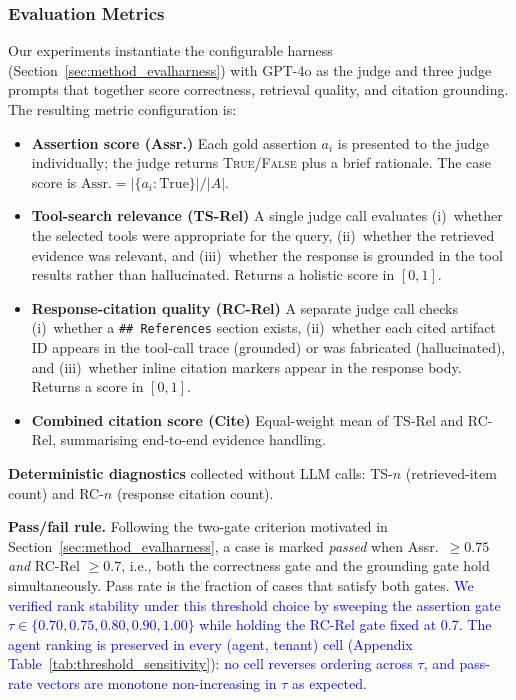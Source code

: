 \subsubsection{Evaluation Metrics}
\label{sec:eval-metrics}
Our experiments instantiate the configurable harness (Section~\ref{sec:method_evalharness}) with GPT-4o as the judge and three judge prompts that together score correctness, retrieval quality, and citation grounding. The resulting metric configuration is:

\begin{itemize}[leftmargin=*,itemsep=2pt,topsep=4pt]
  \item \textbf{Assertion score (Assr.)}  Each gold assertion $a_i$ is presented to the judge individually; the judge returns \textsc{True}/\textsc{False} plus a brief rationale. The case score is $\text{Assr.} = |\{a_i : \text{True}\}| / |A|$.
  \item \textbf{Tool-search relevance (TS-Rel)}  A single judge call evaluates (i)~whether the selected tools were appropriate for the query, (ii)~whether the retrieved evidence was relevant, and (iii)~whether the response is grounded in the tool results rather than hallucinated. Returns a holistic score in $[0,1]$.
  \item \textbf{Response-citation quality (RC-Rel)}  A separate judge call checks (i)~whether a \texttt{\#\#~References} section exists, (ii)~whether each cited artifact ID appears in the tool-call trace (grounded) or was fabricated (hallucinated), and (iii)~whether inline citation markers appear in the response body. Returns a score in $[0,1]$.
  \item \textbf{Combined citation score (Cite)}  Equal-weight mean of TS-Rel and RC-Rel, summarising end-to-end evidence handling.
\end{itemize}

\textbf{Deterministic diagnostics} collected without LLM calls: TS-$n$ (retrieved-item count) and RC-$n$ (response citation count).

\textbf{Pass/fail rule.}  Following the two-gate criterion motivated in Section~\ref{sec:method_evalharness}, a case is marked \emph{passed} when Assr.\ $\geq 0.75$ \emph{and} RC-Rel $\geq 0.7$, i.e., both the correctness gate and the grounding gate hold simultaneously. Pass rate is the fraction of cases that satisfy both gates. \textcolor{blue}{We verified rank stability under this threshold choice by sweeping the assertion gate $\tau \in \{0.70, 0.75, 0.80, 0.90, 1.00\}$ while holding the RC-Rel gate fixed at 0.7. The agent ranking is preserved in every (agent, tenant) cell (Appendix Table~\ref{tab:threshold_sensitivity}): no cell reverses ordering across $\tau$, and pass-rate vectors are monotone non-increasing in $\tau$ as expected.}

